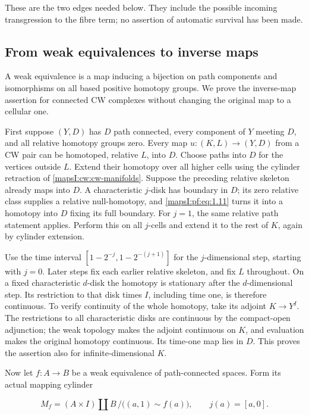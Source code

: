 \documentclass[11pt]{article}
\begin{document}
These are the two edges needed below. They include the possible incoming transgression to the fibre term; no assertion of automatic survival has been made.

\subsection{From weak equivalences to inverse maps}
\label{mapsI:pf:cw-inverses}

A weak equivalence is a map inducing a bijection on path components and isomorphisms on all based positive homotopy groups. We prove the inverse-map assertion for connected CW complexes without changing the original map to a cellular one.

First suppose \((Y,D)\) has \(D\) path connected, every component of \(Y\) meeting \(D\), and all relative homotopy groups zero. Every map \(u:(K,L)\to(Y,D)\) from a CW pair can be homotoped, relative \(L\), into \(D\). Choose paths into \(D\) for the vertices outside \(L\). Extend their homotopy over all higher cells using the cylinder retraction of \cref{mapsI:cw:cw-manifolds}. Suppose the preceding relative skeleton already maps into \(D\). A characteristic \(j\)-disk has boundary in \(D\); its zero relative class supplies a relative null-homotopy, and \eqref{mapsI:pf:eq:1.11} turns it into a homotopy into \(D\) fixing its full boundary. For \(j=1\), the same relative path statement applies. Perform this on all \(j\)-cells and extend it to the rest of \(K\), again by cylinder extension.

Use the time interval \([1-2^{-j},1-2^{-(j+1)}]\) for the \(j\)-dimensional step, starting with \(j=0\). Later steps fix each earlier relative skeleton, and fix \(L\) throughout. On a fixed characteristic \(d\)-disk the homotopy is stationary after the \(d\)-dimensional step. Its restriction to that disk times \(I\), including time one, is therefore continuous. To verify continuity of the whole homotopy, take its adjoint \(K\to Y^I\). The restrictions to all characteristic disks are continuous by the compact-open adjunction; the weak topology makes the adjoint continuous on \(K\), and evaluation makes the original homotopy continuous. Its time-one map lies in \(D\). This proves the assertion also for infinite-dimensional \(K\).

Now let \(f:A\to B\) be a weak equivalence of path-connected spaces. Form its actual mapping cylinder

\begin{equation}
M_f=(A\times I)\amalg B\,/\bigl((a,1)\sim f(a)\bigr),
\qquad j(a)=[a,0].
\label{mapsI:pf:eq:4.1}
\end{equation}
\end{document}
